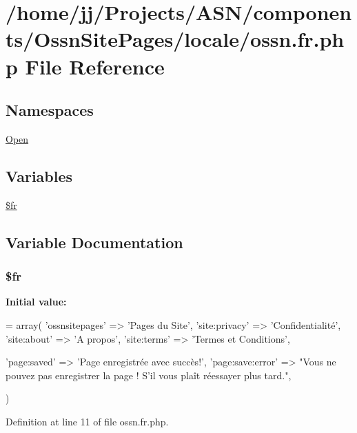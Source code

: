 \hypertarget{components_2_ossn_site_pages_2locale_2ossn_8fr_8php}{}\section{/home/jj/\+Projects/\+A\+S\+N/components/\+Ossn\+Site\+Pages/locale/ossn.fr.\+php File Reference}
\label{components_2_ossn_site_pages_2locale_2ossn_8fr_8php}
\subsection*{Namespaces}
\begin{DoxyCompactItemize}
\item 
 \hyperlink{namespace_open}{Open}
\end{DoxyCompactItemize}
\subsection*{Variables}
\begin{DoxyCompactItemize}
\item 
\hyperlink{components_2_ossn_site_pages_2locale_2ossn_8fr_8php_ad5107c697816e7b7f89ad1b3e94e3e0e}{\$fr}
\end{DoxyCompactItemize}


\subsection{Variable Documentation}
\subsubsection[{\texorpdfstring{\$fr}{$fr}}]{\setlength{\rightskip}{0pt plus 5cm}\$fr}\hypertarget{components_2_ossn_site_pages_2locale_2ossn_8fr_8php_ad5107c697816e7b7f89ad1b3e94e3e0e}{}\label{components_2_ossn_site_pages_2locale_2ossn_8fr_8php_ad5107c697816e7b7f89ad1b3e94e3e0e}
{\bfseries Initial value\+:}
\begin{DoxyCode}
= array(
    \textcolor{stringliteral}{'ossnsitepages'} => \textcolor{stringliteral}{'Pages du Site'},
    \textcolor{stringliteral}{'site:privacy'} => \textcolor{stringliteral}{'Confidentialité'},
    \textcolor{stringliteral}{'site:about'} => \textcolor{stringliteral}{'A propos'},
    \textcolor{stringliteral}{'site:terms'} => \textcolor{stringliteral}{'Termes et Conditions'},

    \textcolor{stringliteral}{'page:saved'} => \textcolor{stringliteral}{'Page enregistrée avec succès!'},
    \textcolor{stringliteral}{'page:save:error'} => \textcolor{stringliteral}{"Vous ne pouvez pas enregistrer la page ! S'il vous plaît réessayer plus tard."},

)
\end{DoxyCode}


Definition at line 11 of file ossn.\+fr.\+php.

